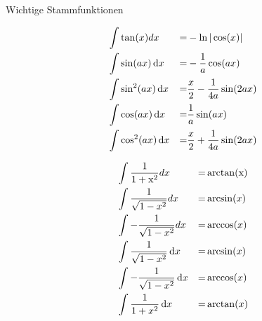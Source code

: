 \begin{highlight}{Wichtige Stammfunktionen}
\begin{center}
\begin{minipage}{0.4\linewidth}
\begin{align*}
                    &\int\tan (x) d x  &=& -\ln |\cos (x)| \\
                    &\int \sin(ax)\dif x  &=&  - \frac{1}{a} \cos(a x)  \\
                    &\int \sin^2(ax)\dif x  &=&  \frac{x}{2} - \frac{1}{4a} \sin(2 a x)  \\
        			&\int \cos(ax)\dif x  &=&  \frac{1}{a} \sin(a x)  \\
        			&\int \cos^2(ax)\dif x  &=&  \frac{x}{2} + \frac{1}{4a} \sin(2 a x)  \\
                \end{align*}
        \end{minipage}
        \hfill\vline\hfill
        \begin{minipage}{0.45\linewidth}
            \begin{align*}
                    &\int\frac{1}{1+\mathrm{x}^{2}} d x  &=& \arctan (\mathrm{x})\\
                    &\int\frac{1}{\sqrt{1-x^{2}}} d x  &=& \arcsin (x) \\
                    &\int -\frac{1}{\sqrt{1-x^{2}}} d x  &=& \arccos (x) \\
        			&\int \frac{1}{\sqrt{1-x^2}}\dif x  &=&  \arcsin(x)  \\
        			&\int -\frac{1}{\sqrt{1-x^2}}\dif x  &=&  \arccos(x)  \\
        			&\int \frac{1}{1+x^2}\dif x  &=&  \arctan(x)  \\
            \end{align*}
        \end{minipage}
    \end{center}
\end{highlight}

\columnbreak

